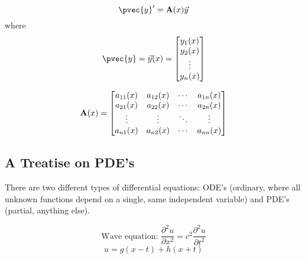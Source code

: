 \documentclass[12pt]{article}
\begin{document}
\[ 
\pvec{y}' = {\bf A}(x)\vec{y} 
\]
where 
\[
\pvec{y} = \vec{y}(x) = 
\begin{bmatrix}
y_1(x) \\
y_2(x) \\
\vdots \\
y_n(x)
\end{bmatrix}
\]

\[
{\bf A}(x) = 
\begin{bmatrix}
a_{11}(x) & a_{12}(x) & \cdots & a_{1n}(x) \\
a_{21}(x) & a_{22}(x) & \cdots & a_{2n}(x) \\
\vdots & \vdots & \ddots & \vdots \\ 
a_{n1}(x) & a_{n2}(x) & \cdots & a_{nn}(x) 
\end{bmatrix}
\]

\subsection{A Treatise on PDE's}
There are two different types of differential equations: ODE's (ordinary, where all unknown functions depend on a single, same independent variable) and PDE's (partial, anything else). 

\[ \text{Wave equation: } \frac{\partial^2u}{\partial x^2} = c^2 \frac{\partial^2u}{\partial t^2} \]
\[ u = g(x-t) + h(x+t) \]
\end{document}
